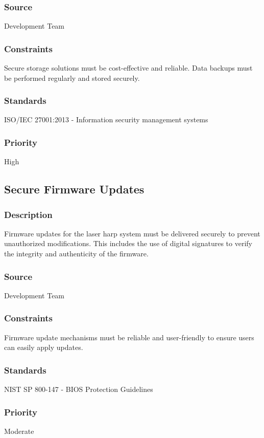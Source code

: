 \subsubsection{Source}
Development Team
\subsubsection{Constraints}
Secure storage solutions must be cost-effective and reliable. Data backups must be performed regularly and stored securely.
\subsubsection{Standards}
ISO/IEC 27001:2013 - Information security management systems
\subsubsection{Priority}
High


\subsection{Secure Firmware Updates}
\subsubsection{Description}
Firmware updates for the laser harp system must be delivered securely to prevent unauthorized modifications. This includes the use of digital signatures to verify the integrity and authenticity of the firmware.
\subsubsection{Source}
Development Team
\subsubsection{Constraints}
Firmware update mechanisms must be reliable and user-friendly to ensure users can easily apply updates.
\subsubsection{Standards}
NIST SP 800-147 - BIOS Protection Guidelines
\subsubsection{Priority}
Moderate
